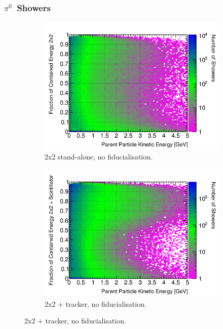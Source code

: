 \documentclass[10pt,a4paper,openany]{article}
\begin{document}
\subsubsection{$\pi^{0}$~Showers}
\begin{figure}[htbp]
	\centering
	\begin{subfigure}[b]{0.49\textwidth}
		\centering
		\includegraphics[width=1.0\textwidth]{Pi0_contained_frac_2x2.png}
		\caption{2x2 stand-alone, no fiducialisation.}
		\label{}
	\end{subfigure}	
	\hfill
	\begin{subfigure}[b]{0.49\textwidth}
		\centering
		\includegraphics[width=1.0\textwidth]{Pi0_contained_frac_2x2_Scintillator_gap.png}
		\caption{2x2 + tracker, no fiducialisation.}
		\label{}

\end{subfigure}
\end{figure}
\end{document}
